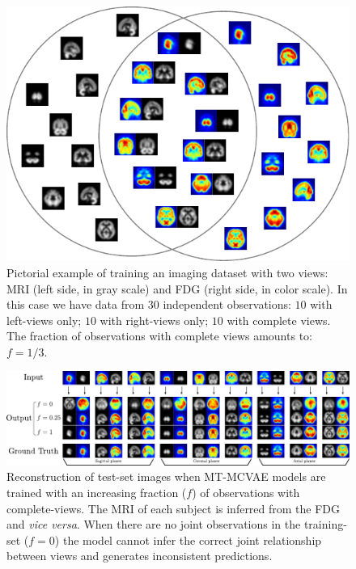 \begin{figure}[!h]
\centering
\includegraphics[width=0.8\columnwidth]{./tex/fig/nimg_scheme.pdf}
\caption{
	Pictorial example of training an imaging dataset with two views: MRI (left side, in gray scale) and FDG (right side, in color scale).
	In this case we have data from 30 independent observations:
	$10$ with left-views only; $10$ with right-views only; $10$ with complete views.
	The fraction of observations with complete views amounts to: $f = 1/3$.
}
\label{fig:nimg_scheme}
\end{figure}
%
\begin{figure}[!t]
\centering
\includegraphics[width=\textwidth]{./tex/fig/nimg_test.pdf}
\caption{
	Reconstruction of test-set images when MT-MCVAE models are trained with an increasing fraction ($f$) of observations with complete-views.
	The MRI of each subject is inferred from the FDG and \textit{vice versa}.
	When there are no joint observations in the training-set ($f=0$) the model cannot infer the correct joint relationship between views and generates inconsistent predictions.
}
\label{fig:nimg_test}
\end{figure}
